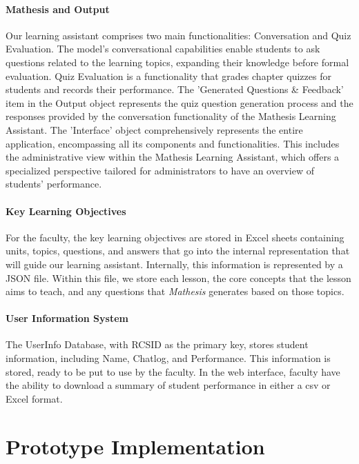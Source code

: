 \documentclass[12pt,a4paper]{article}
\begin{document}
    \paragraph{Mathesis and Output}
    Our learning assistant comprises two main functionalities: Conversation and Quiz Evaluation.
    The model's conversational capabilities enable students to ask questions related to the learning
    topics, expanding their knowledge before formal evaluation. Quiz Evaluation is a functionality
    that grades chapter quizzes for students and records their performance. The 'Generated Questions
    \& Feedback' item in the Output object represents the quiz question generation process and the
    responses provided by the conversation functionality of the Mathesis Learning Assistant. 
    The 'Interface' object comprehensively represents the entire application, encompassing all its components and functionalities. 
    This includes the administrative view within the Mathesis Learning Assistant, which offers a specialized perspective tailored for administrators to have an overview of students' performance.

    \paragraph{Key Learning Objectives}
    For the faculty, the key learning
    objectives are stored in Excel sheets containing units, topics, questions, and answers that
    go into the internal representation that will guide our learning assistant.  Internally, this
    information is represented by a JSON file.  Within this file, we store each lesson, the core
    concepts that the lesson aims to teach, and any questions that \textit{Mathesis} generates based
    on those topics.

    \paragraph{User Information System}
    The UserInfo Database, with RCSID as the primary key, stores student information, including Name,
    Chatlog, and Performance.  This information is stored, ready to be put to use by the faculty.
    In the web interface, faculty have the ability to download a summary of student performance
    in either a csv or Excel format.



    \section{Prototype Implementation}
\end{document}
